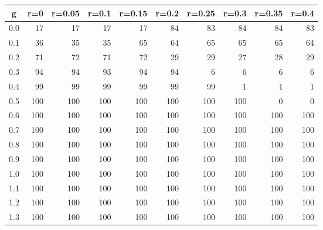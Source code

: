 %
\begin{table}[!tbp]
 \begin{center}
 \begin{tabular}{rrrrrrrrrr}\hline\hline
\multicolumn{1}{c}{g}&\multicolumn{1}{c}{r=0}&\multicolumn{1}{c}{r=0.05}&\multicolumn{1}{c}{r=0.1}&\multicolumn{1}{c}{r=0.15}&\multicolumn{1}{c}{r=0.2}&\multicolumn{1}{c}{r=0.25}&\multicolumn{1}{c}{r=0.3}&\multicolumn{1}{c}{r=0.35}&\multicolumn{1}{c}{r=0.4}\tabularnewline
\hline
0.0& 17& 17& 17& 17& 84& 83& 84& 84& 83\tabularnewline
0.1& 36& 35& 35& 65& 64& 65& 65& 65& 64\tabularnewline
0.2& 71& 72& 71& 72& 29& 29& 27& 28& 29\tabularnewline
0.3& 94& 94& 93& 94& 94&  6&  6&  6&  6\tabularnewline
0.4& 99& 99& 99& 99& 99& 99&  1&  1&  1\tabularnewline
0.5&100&100&100&100&100&100&100&  0&  0\tabularnewline
0.6&100&100&100&100&100&100&100&100&100\tabularnewline
0.7&100&100&100&100&100&100&100&100&100\tabularnewline
0.8&100&100&100&100&100&100&100&100&100\tabularnewline
0.9&100&100&100&100&100&100&100&100&100\tabularnewline
1.0&100&100&100&100&100&100&100&100&100\tabularnewline
1.1&100&100&100&100&100&100&100&100&100\tabularnewline
1.2&100&100&100&100&100&100&100&100&100\tabularnewline
1.3&100&100&100&100&100&100&100&100&100\tabularnewline
\hline
\end{tabular}

\end{center}

\end{table}

